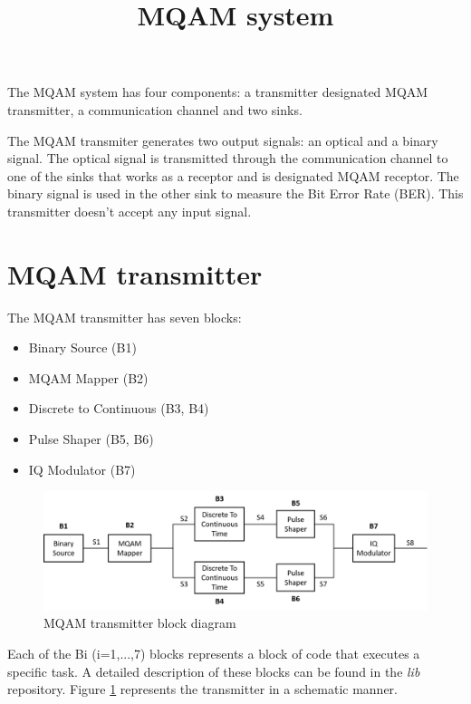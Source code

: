 \documentclass[a4paper]{article}
\title{MQAM system}
\begin{document}
	\maketitle
	
The MQAM system has four components: a transmitter designated MQAM transmitter, a communication channel and two sinks. 

The MQAM transmiter generates two output signals: an optical and a binary signal. The optical signal is transmitted through the communication channel to one of the sinks that works as a receptor and is designated MQAM receptor. The binary signal is used in the other sink to measure the Bit Error Rate (BER). This transmitter doesn't accept any input signal.
	
\section*{MQAM transmitter}

The MQAM transmitter has seven blocks:

\begin{itemize}
	\item Binary Source (B1)
	\item MQAM Mapper (B2)
	\item Discrete to Continuous (B3, B4)
	\item Pulse Shaper (B5, B6)
	\item IQ Modulator (B7)
\end{itemize}

\begin{figure}
	\includegraphics[width=1.2\textwidth]{MQAM_transmitter_block_diagram}
	\caption{MQAM transmitter block diagram}
	\label{MQAM_system_block_diagram}
\end{figure}

Each of the Bi (i=1,...,7) blocks represents a block of code that executes a specific task. A detailed description of these blocks can be found in the \textit{lib} repository. Figure \ref{MQAM_system_block_diagram} represents the transmitter in a schematic manner.
\end{document}
